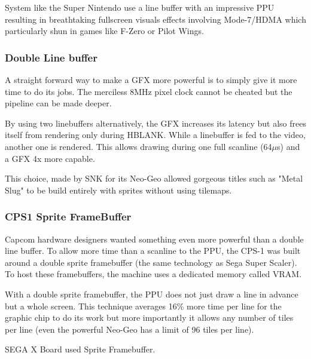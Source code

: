 System like the Super Nintendo use a line buffer with an impressive PPU resulting in breathtaking fullscreen visuals effects involving Mode-7/HDMA which particularly shun in games like F-Zero or Pilot Wings.








\subsubsection{Double Line buffer}
A straight forward way to make a GFX more powerful is to simply give it more time to do its jobs. The merciless 8MHz pixel clock cannot be cheated but the pipeline can be made deeper.

By using two linebuffers alternatively, the GFX increases its latency but also frees itself from rendering only during HBLANK. While a linebuffer is fed to the video, another one is rendered. This allows drawing during one full scanline (64$\mu$s) and a GFX 4x more capable. 

This choice, made by SNK for its Neo-Geo allowed gorgeous titles such as "Metal Slug" to be build entirely with sprites without using tilemaps.




\subsubsection{CPS1 Sprite FrameBuffer}
Capcom hardware designers wanted something even more powerful than a double line buffer. To allow more time than a scanline to the PPU, the CPS-1 was built around a double sprite framebuffer (the same technology as  Sega Super Scaler). To host these framebuffers, the machine uses a dedicated memory called VRAM.

With a double sprite framebuffer, the PPU does not just draw a line in advance but a whole screen. This technique averages 16\% more time per line for the graphic chip to do its work but more importantly it allows any number of tiles per line (even the powerful Neo-Geo has a limit of 96 tiles per line).

\begin{trivia}
SEGA X Board used Sprite Framebuffer.
\end{trivia}

